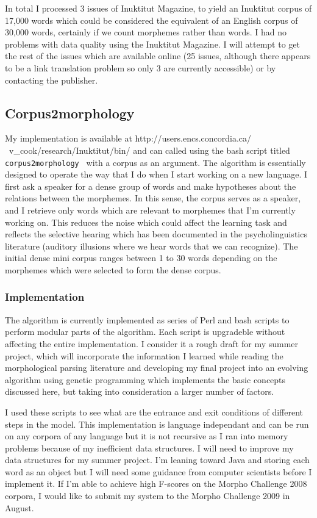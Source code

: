 \documentclass[runningheads,a4paper]{llncs}
\begin{document}
In total I processed 3 issues of Inuktitut Magazine, to yield an Inuktitut corpus of 17,000 words which could be considered the equivalent of an English corpus of 30,000 words, certainly if we count morphemes rather than words. I had no problems with data quality using the Inuktitut Magazine. I will attempt to get the rest of the issues which are available online (25 issues, although there appears to be a link translation problem so only 3 are currently accessible) or by contacting the publisher. 

\subsection{Corpus2morphology}

My implementation is available at http://users.encs.concordia.ca/ ~v\_cook/research/Inuktitut/bin/ and can called using the bash script titled {\tt corpus2morphology } with a corpus as an argument. The algorithm is essentially  designed to operate the way that I do when I start working on a new language. I first ask a speaker for a dense group of words and make hypotheses about the relations between the morphemes. In this sense, the corpus serves as a speaker, and I retrieve only words which are relevant to morphemes that I'm currently working on. This reduces the noise which could affect the learning task and reflects the selective hearing which has been documented in the psycholinguistics literature (auditory illusions where we hear words that we can recognize). The initial dense mini corpus ranges between 1 to 30 words depending on the morphemes which were selected to form the dense corpus. 

\subsubsection{Implementation}

The algorithm is currently implemented as series of Perl and bash scripts to perform modular parts of the algorithm. Each script is upgradeble without affecting the entire implementation. I consider it a rough draft for my summer project, which will incorporate the information I learned while reading the morphological parsing literature and developing my final project into an evolving algorithm using genetic programming which implements the basic concepts discussed here, but taking into consideration a larger number of factors. 

I used these scripts to see what are the entrance and exit conditions of different steps in the model. This implementation is language independant and can be run on any corpora of any language but it is not recursive as I ran into memory problems because of my inefficient data structures. I will need to improve my data structures for my summer project. I'm leaning toward Java and storing each word as an object but I will need some guidance from computer scientists before I implement it. If I'm able to achieve high F-scores on the Morpho Challenge 2008 corpora, I would like to submit my system to the Morpho Challenge 2009 in August. 
\end{document}

